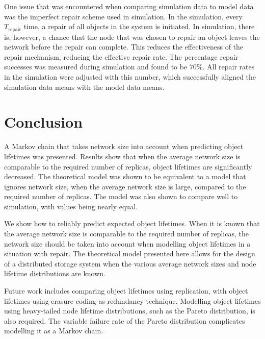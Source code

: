 One issue that was encountered when comparing simulation data to model data was the imperfect repair scheme used in simulation. In the simulation, every $T_{\textrm{repair}}$ time, a repair of all objects in the system is initiated. In simulation, there is, however, a chance that the node that was chosen to repair an object leaves the network before the repair can complete. This reduces the effectiveness of the repair mechanism, reducing the effective repair rate. The percentage repair successes was measured during simulation and found to be $70 \%$. All repair rates in the simulation were adjusted with this number, which successfully aligned the simulation data means with the model data means.

\section{Conclusion}

A Markov chain that takes network size into account when predicting object lifetimes was presented. Results show that when the average network size is comparable to the required number of replicas, object lifetimes are significantly decreased. The theoretical model was shown to be equivalent to a model that ignores network size, when the average network size is large, compared to the required number of replicas. The model was also shown to compare well to simulation, with values being nearly equal.

We show how to reliably predict expected object lifetimes. When it is known that the average network size is comparable to the required number of replicas, the network size should be taken into account when modelling object lifetimes in a situation with repair. The theoretical model presented here allows for the design of a distributed storage system when the various average network sizes and node lifetime distributions are known.

Future work includes comparing object lifetimes using replication, with object lifetimes using erasure coding as redundancy technique. Modelling object lifetimes using heavy-tailed node lifetime distributions, such as the Pareto distribution, is also required. The variable failure rate of the Pareto distribution complicates modelling it as a Markov chain.
